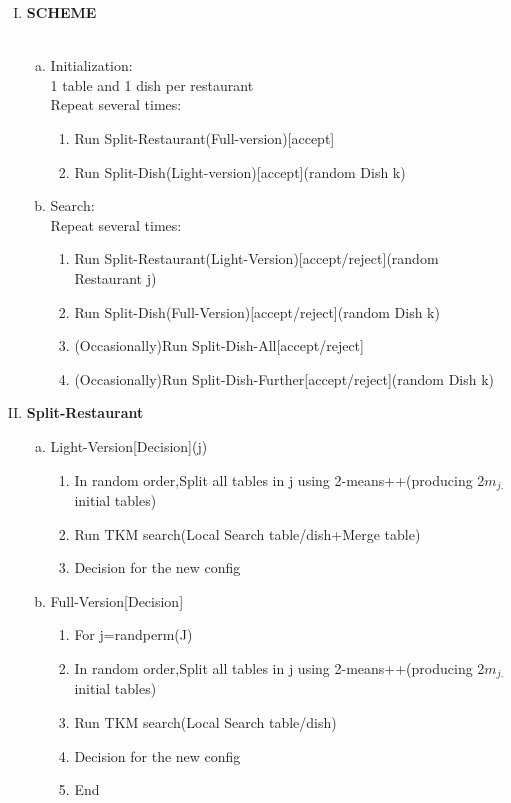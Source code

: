 \documentclass{article}
\begin{document}
\begin{spacing}{1.1}
\begin{enumerate}[(I)]
\item {\bf SCHEME}\\ \\
\begin{enumerate}[(a)]
 \item Initialization:\\
    1 table and 1 dish per restaurant\\
      Repeat several times:
       \begin{enumerate}[(1)]
        \item Run Split-Restaurant(Full-version)[accept]
	\item Run Split-Dish(Light-version)[accept](random Dish k)
      \end{enumerate}
\item Search:\\
  Repeat several times:
   \begin{enumerate}[(1)]
     \item Run Split-Restaurant(Light-Version)[accept/reject](random Restaurant j)
     \item Run Split-Dish(Full-Version)[accept/reject](random Dish k)
     \item (Occasionally)Run Split-Dish-All[accept/reject]
     \item (Occasionally)Run Split-Dish-Further[accept/reject](random Dish k)
    \end{enumerate}

\end{enumerate}
\item {\bf Split-Restaurant}
\begin{enumerate}[(a)]
 \item Light-Version[Decision](j)
\begin{enumerate}[(1)]
\item In random order,Split all tables in j using 2-means++(producing 2$m_{j.}$ initial tables)
\item Run TKM search(Local Search table/dish+Merge table)
\item Decision for the new config
\end{enumerate}
 \item Full-Version[Decision]
\begin{enumerate}[(1)]
\item For j=randperm(J)
\item In random order,Split all tables in j using 2-means++(producing 2$m_{j.}$ initial tables)
\item Run TKM search(Local Search table/dish)
\item Decision for the new config
\item End
\end{enumerate}


\end{enumerate}
\end{enumerate}
\end{spacing}
\end{document}
